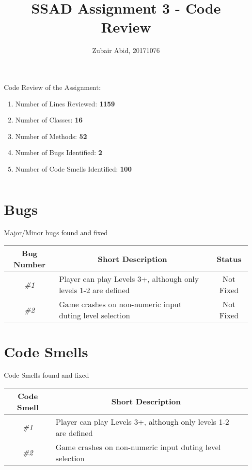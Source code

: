 \documentclass[11pt,a4paper]{article}
\title{SSAD Assignment 3 - Code Review}
\author{Zubair Abid, 20171076}
\date{}
\begin{document}
	\maketitle
	Code Review of the Assignment:\\
    \begin{enumerate}
    	\item Number of Lines Reviewed: \textbf{1159}
    	
    	\item Number of Classes: \textbf{16}
    	
    	\item Number of Methods: \textbf{52}
    	
    	\item Number of Bugs Identified: \textbf{2}
    	
    	\item Number of Code Smells Identified: \textbf{100}
    \end{enumerate}
	$ $\\
	
	\section{Bugs}	
	Major/Minor bugs found and fixed	

	\begin{table}[H]
		\centering
		\begin{tabular}{@{}clc@{}}
			\toprule
			\textbf{Bug Number} & \multicolumn{1}{c}{\textbf{Short Description}} & \textbf{Status} \\ \midrule
			\textit{\#1} & Player can play Levels 3+,  although only levels 1-2 are defined & Not Fixed \\
			\textit{\#2} & Game crashes on non-numeric input duting level selection & Not Fixed \\ \bottomrule
		\end{tabular}
	\end{table}

	\section{Code Smells}
	Code Smells found and fixed	
		
	\begin{table}[H]
		\centering
		\begin{tabular}{@{}clc@{}}
			\toprule
			\textbf{Code Smell} & \multicolumn{1}{c}{\textbf{Short Description}}\\ \midrule
			\textit{\#1} & Player can play Levels 3+,  although only levels 1-2 are defined \\
			\textit{\#2} & Game crashes on non-numeric input duting level selection \\ \bottomrule
		\end{tabular}
	\end{table}
	
\end{document}
